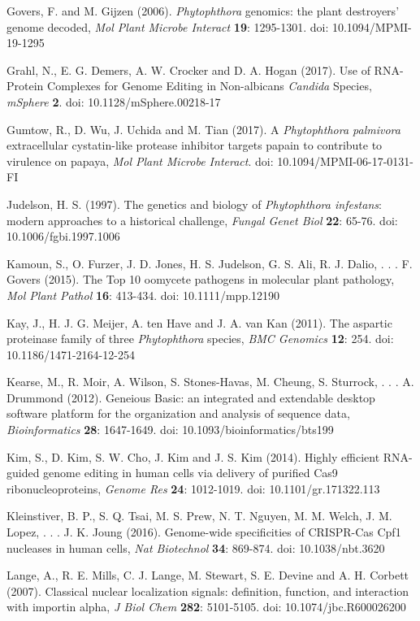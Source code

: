 \documentclass[onecolumn, 11pt,openany]{memoir}
\begin{document}
\begin{multicols}{2}
\begin{sloppy}
\begin{footnotesize}
Govers, F. and M. Gijzen (2006). \textit{Phytophthora }genomics: the plant destroyers' genome decoded, \textit{Mol Plant Microbe Interact} \textbf{19}: 1295-1301. doi: 10.1094/MPMI-19-1295

Grahl, N., E. G. Demers, A. W. Crocker and D. A. Hogan (2017). Use of RNA-Protein Complexes for Genome Editing in Non-albicans \textit{Candida} Species, \textit{mSphere} \textbf{2}. doi: 10.1128/mSphere.00218-17

Gumtow, R., D. Wu, J. Uchida and M. Tian (2017). A \textit{Phytophthora palmivora} extracellular cystatin-like protease inhibitor targets papain to contribute to virulence on papaya, \textit{Mol Plant Microbe Interact}. doi: 10.1094/MPMI-06-17-0131-FI

Judelson, H. S. (1997). The genetics and biology of \textit{Phytophthora infestans}: modern approaches to a historical challenge, \textit{Fungal Genet Biol} \textbf{22}: 65-76. doi: 10.1006/fgbi.1997.1006

Kamoun, S., O. Furzer, J. D. Jones, H. S. Judelson, G. S. Ali, R. J. Dalio, . . . F. Govers (2015). The Top 10 oomycete pathogens in molecular plant pathology, \textit{Mol Plant Pathol} \textbf{16}: 413-434. doi: 10.1111/mpp.12190

Kay, J., H. J. G. Meijer, A. ten Have and J. A. van Kan (2011). The aspartic proteinase family of three \textit{Phytophthora }species, \textit{BMC Genomics} \textbf{12}: 254. doi: 10.1186/1471-2164-12-254

Kearse, M., R. Moir, A. Wilson, S. Stones-Havas, M. Cheung, S. Sturrock, . . . A. Drummond (2012). Geneious Basic: an integrated and extendable desktop software platform for the organization and analysis of sequence data, \textit{Bioinformatics} \textbf{28}: 1647-1649. doi: 10.1093/bioinformatics/bts199

Kim, S., D. Kim, S. W. Cho, J. Kim and J. S. Kim (2014). Highly efficient RNA-guided genome editing in human cells via delivery of purified Cas9 ribonucleoproteins, \textit{Genome Res} \textbf{24}: 1012-1019. doi: 10.1101/gr.171322.113

Kleinstiver, B. P., S. Q. Tsai, M. S. Prew, N. T. Nguyen, M. M. Welch, J. M. Lopez, . . . J. K. Joung (2016). Genome-wide specificities of CRISPR-Cas Cpf1 nucleases in human cells, \textit{Nat Biotechnol} \textbf{34}: 869-874. doi: 10.1038/nbt.3620

Lange, A., R. E. Mills, C. J. Lange, M. Stewart, S. E. Devine and A. H. Corbett (2007). Classical nuclear localization signals: definition, function, and interaction with importin alpha, \textit{J Biol Chem} \textbf{282}: 5101-5105. doi: 10.1074/jbc.R600026200


\end{footnotesize}
\end{sloppy}
\end{multicols}
\end{document}
